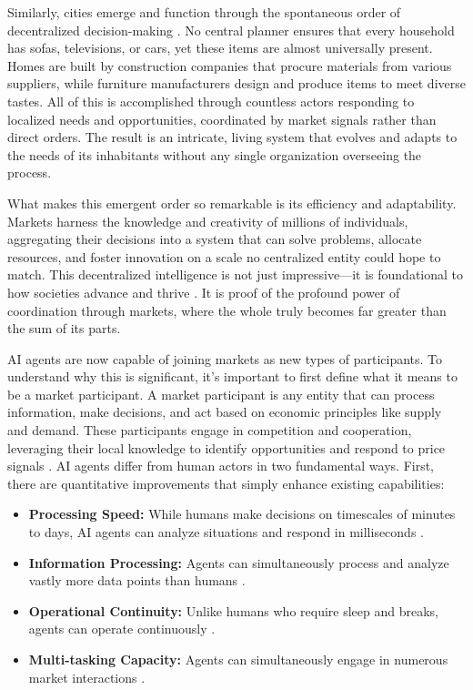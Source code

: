 \documentclass{article}
\begin{document}
Similarly, cities emerge and function through the spontaneous order of decentralized decision-making \cite{schelling1978micromotives}. No central planner ensures that every household has sofas, televisions, or cars, yet these items are almost universally present. Homes are built by construction companies that procure materials from various suppliers, while furniture manufacturers design and produce items to meet diverse tastes. All of this is accomplished through countless actors responding to localized needs and opportunities, coordinated by market signals rather than direct orders. The result is an intricate, living system that evolves and adapts to the needs of its inhabitants without any single organization overseeing the process.

What makes this emergent order so remarkable is its efficiency and adaptability. Markets harness the knowledge and creativity of millions of individuals, aggregating their decisions into a system that can solve problems, allocate resources, and foster innovation on a scale no centralized entity could hope to match. This decentralized intelligence is not just impressive—it is foundational to how societies advance and thrive \cite{arthur2009nature}. It is proof of the profound power of coordination through markets, where the whole truly becomes far greater than the sum of its parts.

AI agents are now capable of joining markets as new types of participants. To understand why this is significant, it's important to first define what it means to be a market participant. A market participant is any entity that can process information, make decisions, and act based on economic principles like supply and demand. These participants engage in competition and cooperation, leveraging their local knowledge to identify opportunities and respond to price signals \cite{bostrom2014superintelligence}.
AI agents differ from human actors in two fundamental ways. First, there are quantitative improvements that simply enhance existing capabilities:
\begin{itemize}
    \item \textbf{Processing Speed:} While humans make decisions on timescales of minutes to days, AI agents can analyze situations and respond in milliseconds \cite{lopez2018financial}.
    \item \textbf{Information Processing:} Agents can simultaneously process and analyze vastly more data points than humans \cite{kaplan2020scaling}.
    \item \textbf{Operational Continuity:} Unlike humans who require sleep and breaks, agents can operate continuously \cite{brynjolfsson2014second}.
    \item \textbf{Multi-tasking Capacity:} Agents can simultaneously engage in numerous market interactions \cite{brynjolfsson2014second}.
\end{itemize}
\end{document}
